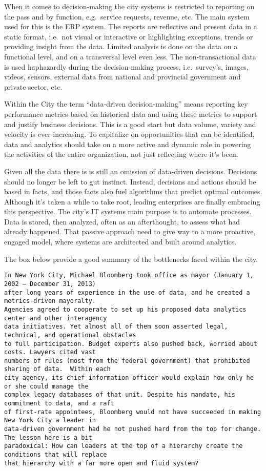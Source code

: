\documentclass[]{book}
\theoremstyle{definition}
\theoremstyle{definition}
\theoremstyle{definition}
\theoremstyle{remark}
\begin{document}
When it comes to decision-making the city systems is restricted to
reporting on the pass and by function, e.g.~service requests, revenue,
etc. The main system used for this is the ERP system. The reports are
reflective and present data in a static format, i.e.~not visual or
interactive or highlighting exceptions, trends or providing insight from
the data. Limited analysis is done on the data on a functional level,
and on a transversal level even less. The non-transactional data is used
haphazardly during the decision-making process, i.e.~survey's, images,
videos, sensors, external data from national and provincial government
and private sector, etc.

Within the City the term ``data-driven decision-making'' means reporting
key performance metrics based on historical data and using these metrics
to support and justify business decisions. This is a good start but data
volume, variety and velocity is ever-increasing. To capitalize on
opportunities that can be identified, data and analytics should take on
a more active and dynamic role in powering the activities of the entire
organization, not just reflecting where it's been.

Given all the data there is is still an omission of data-driven
decisions. Decisions should no longer be left to gut instinct. Instead,
decisions and actions should be based in facts, and those facts also
fuel algorithms that predict optimal outcomes. Although it's taken a
while to take root, leading enterprises are finally embracing this
perspective. The city's IT systems main purpose is to automate
processes. Data is stored, then analyzed, often as an afterthought, to
assess what had already happened. That passive approach need to give way
to a more proactive, engaged model, where systems are architected and
built around analytics.

The box below provide a good summary of the bottlenecks faced within the
city.

\begin{verbatim}
In New York City, Michael Bloomberg took office as mayor (January 1, 2002 – December 31, 2013)
after long years of experience in the use of data, and he created a metrics-driven mayoralty.
Agencies agreed to cooperate to set up his proposed data analytics center and other interagency
data initiatives. Yet almost all of them soon asserted legal, technical, and operational obstacles
to full participation. Budget experts also pushed back, worried about costs. Lawyers cited vast
numbers of rules (most from the federal government) that prohibited sharing of data.  Within each
city agency, its chief information officer would explain how only he or she could manage the
complex legacy databases of that unit. Despite his mandate, his commitment to data, and a raft
of first-rate appointees, Bloomberg would not have succeeded in making New York City a leader in
data-driven government had he not pushed hard from the top for change. The lesson here is a bit
paradoxical: How can leaders at the top of a hierarchy create the conditions that will replace
that hierarchy with a far more open and fluid system?
\end{verbatim}
\end{document}
